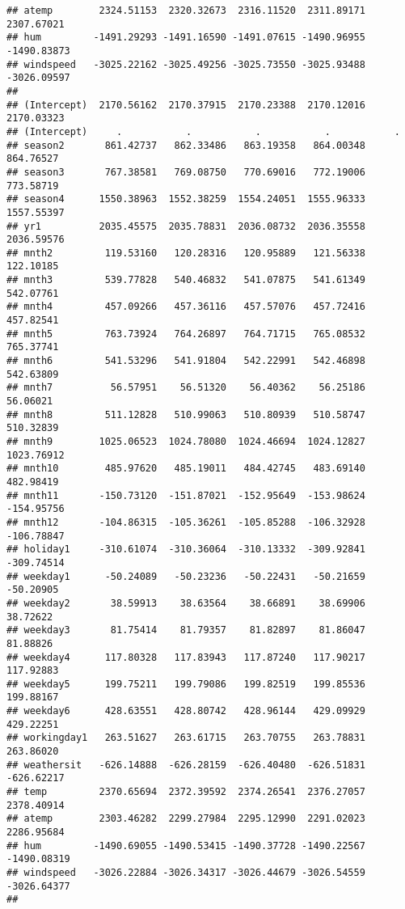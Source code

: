 \documentclass[]{article}
\begin{document}
\begin{verbatim}
## atemp        2324.51153  2320.32673  2316.11520  2311.89171  2307.67021
## hum         -1491.29293 -1491.16590 -1491.07615 -1490.96955 -1490.83873
## windspeed   -3025.22162 -3025.49256 -3025.73550 -3025.93488 -3026.09597
##                                                                        
## (Intercept)  2170.56162  2170.37915  2170.23388  2170.12016  2170.03323
## (Intercept)     .           .           .           .           .      
## season2       861.42737   862.33486   863.19358   864.00348   864.76527
## season3       767.38581   769.08750   770.69016   772.19006   773.58719
## season4      1550.38963  1552.38259  1554.24051  1555.96333  1557.55397
## yr1          2035.45575  2035.78831  2036.08732  2036.35558  2036.59576
## mnth2         119.53160   120.28316   120.95889   121.56338   122.10185
## mnth3         539.77828   540.46832   541.07875   541.61349   542.07761
## mnth4         457.09266   457.36116   457.57076   457.72416   457.82541
## mnth5         763.73924   764.26897   764.71715   765.08532   765.37741
## mnth6         541.53296   541.91804   542.22991   542.46898   542.63809
## mnth7          56.57951    56.51320    56.40362    56.25186    56.06021
## mnth8         511.12828   510.99063   510.80939   510.58747   510.32839
## mnth9        1025.06523  1024.78080  1024.46694  1024.12827  1023.76912
## mnth10        485.97620   485.19011   484.42745   483.69140   482.98419
## mnth11       -150.73120  -151.87021  -152.95649  -153.98624  -154.95756
## mnth12       -104.86315  -105.36261  -105.85288  -106.32928  -106.78847
## holiday1     -310.61074  -310.36064  -310.13332  -309.92841  -309.74514
## weekday1      -50.24089   -50.23236   -50.22431   -50.21659   -50.20905
## weekday2       38.59913    38.63564    38.66891    38.69906    38.72622
## weekday3       81.75414    81.79357    81.82897    81.86047    81.88826
## weekday4      117.80328   117.83943   117.87240   117.90217   117.92883
## weekday5      199.75211   199.79086   199.82519   199.85536   199.88167
## weekday6      428.63551   428.80742   428.96144   429.09929   429.22251
## workingday1   263.51627   263.61715   263.70755   263.78831   263.86020
## weathersit   -626.14888  -626.28159  -626.40480  -626.51831  -626.62217
## temp         2370.65694  2372.39592  2374.26541  2376.27057  2378.40914
## atemp        2303.46282  2299.27984  2295.12990  2291.02023  2286.95684
## hum         -1490.69055 -1490.53415 -1490.37728 -1490.22567 -1490.08319
## windspeed   -3026.22884 -3026.34317 -3026.44679 -3026.54559 -3026.64377
##                                                                        

\end{verbatim}
\end{document}
